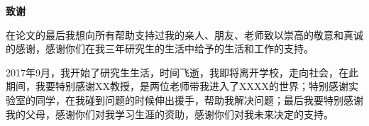 \documentclass[UTF8,zihao=-4]{oucart}
\begin{document}
    \begin{center}
         \textbf{致谢} \\
    \end{center}

    在论文的最后我想向所有帮助支持过我的亲人、朋友、老师致以崇高的敬意和真诚的感谢，感谢你们在我三年研究生的生活中给予的生活和工作的支持。

    2017年9月，我开始了研究生生活，时间飞逝，我即将离开学校，走向社会，在此期间，我要特别感谢XX教授，是两位老师带我进入了XXXX的世界；特别感谢实验室的同学，在我碰到问题的时候伸出援手，帮助我解决问题；最后我要特别感谢我的父母，感谢你们对我学习生涯的资助，感谢你们对我未来决定的支持。
\end{document}
